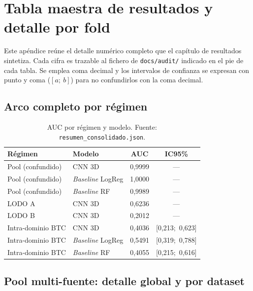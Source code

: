 \chapter{Tabla maestra de resultados y detalle por fold}

Este apéndice reúne el detalle numérico completo que el capítulo de resultados
sintetiza. Cada cifra es trazable al fichero de \texttt{docs/audit/} indicado en
el pie de cada tabla. Se emplea coma decimal y los intervalos de confianza se
expresan con punto y coma ($[a;\ b]$) para no confundirlos con la coma decimal.

\section{Arco completo por régimen}

\begin{table}[ht]
  \centering
  \caption[Arco de validación completo]{AUC por régimen y modelo. Fuente:
  \texttt{resumen\_consolidado.json}.}
  \label{tab:apx_arco}
  \begin{tabular}{l l c c}
    \hline
    \textbf{Régimen} & \textbf{Modelo} & \textbf{AUC} & \textbf{IC95\%} \\
    \hline
    Pool (confundido)   & CNN 3D                 & 0,9999 & --- \\
    Pool (confundido)   & \emph{Baseline} LogReg & 1,0000 & --- \\
    Pool (confundido)   & \emph{Baseline} RF     & 0,9989 & --- \\
    LODO A              & CNN 3D                 & 0,6236 & --- \\
    LODO B              & CNN 3D                 & 0,2012 & --- \\
    Intra-dominio BTC   & CNN 3D                 & 0,4036 & [0,213;\ 0,623] \\
    Intra-dominio BTC   & \emph{Baseline} LogReg & 0,5491 & [0,319;\ 0,788] \\
    Intra-dominio BTC   & \emph{Baseline} RF     & 0,4055 & [0,215;\ 0,616] \\
    \hline
  \end{tabular}
\end{table}

\section{Pool multi-fuente: detalle global y por dataset}

